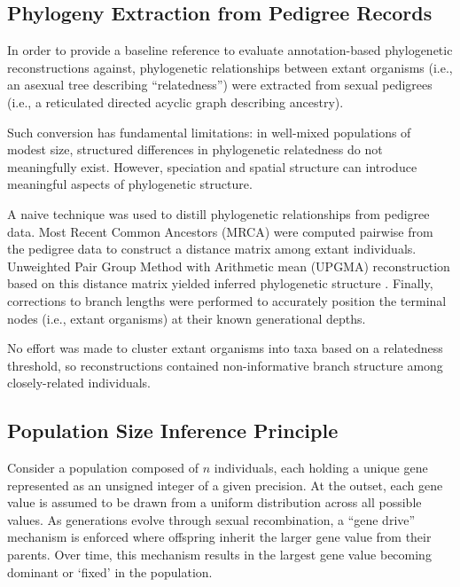 \subsection{Phylogeny Extraction from Pedigree Records}
\label{sec:phylogeny-extraction}

In order to provide a baseline reference to evaluate annotation-based phylogenetic reconstructions against, phylogenetic relationships between extant organisms (i.e., an asexual tree describing ``relatedness'') were extracted from sexual pedigrees (i.e., a reticulated directed acyclic graph describing ancestry).

Such conversion has fundamental limitations: in well-mixed populations of modest size, structured differences in phylogenetic relatedness do not meaningfully exist.
However, speciation and spatial structure can introduce meaningful aspects of phylogenetic structure.

A naive technique was used to distill phylogenetic relationships from pedigree data.
Most Recent Common Ancestors (MRCA) were computed pairwise from the pedigree data to construct a distance matrix among extant individuals.
Unweighted Pair Group Method with Arithmetic mean (UPGMA) reconstruction based on this distance matrix yielded inferred phylogenetic structure \citep{sokal1958university}.
Finally, corrections to branch lengths were performed to accurately position the terminal nodes (i.e., extant organisms) at their known generational depths.

No effort was made to cluster extant organisms into taxa based on a relatedness threshold, so reconstructions contained non-informative branch structure among closely-related individuals.

\subsection{Population Size Inference Principle}
\label{sec:population-size-inference-principle}

Consider a population composed of $n$ individuals, each holding a unique gene represented as an unsigned integer of a given precision.
At the outset, each gene value is assumed to be drawn from a uniform distribution across all possible values.
As generations evolve through sexual recombination, a ``gene drive'' mechanism is enforced where offspring inherit the larger gene value from their parents.
Over time, this mechanism results in the largest gene value becoming dominant or `fixed' in the population.

